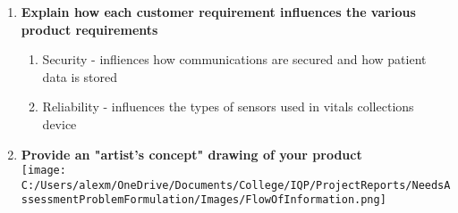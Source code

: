 \documentclass[man]{article}
\begin{document}
\begin{enumerate}
\begin{enumerate}
          \item \textbf{Explain how each customer requirement influences the various product requirements}
            \begin{enumerate}
              \item Security - infliences how communications are secured and how patient data is stored
              \item Reliability - influences the types of sensors used in vitals collections device
            \end{enumerate}
          \clearpage

          \item \textbf{Provide an "artist’s concept" drawing of your product}
            \\\texttt{[image: C:/Users/alexm/OneDrive/Documents/College/IQP/ProjectReports/NeedsAssessmentProblemFormulation/Images/FlowOfInformation.png]}
        \end{enumerate}
    \end{enumerate}
    \newpage



    
    
\end{document}
